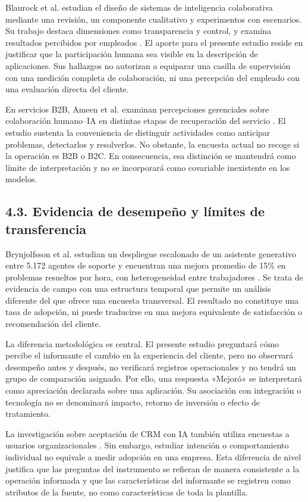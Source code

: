 \documentclass[12pt,letterpaper]{article}
\begin{document}
Blaurock et al. estudian el diseño de sistemas de inteligencia colaborativa mediante una revisión, un componente cualitativo y experimentos con escenarios. Su trabajo destaca dimensiones como transparencia y control, y examina resultados percibidos por empleados \citep{blaurock}. El aporte para el presente estudio reside en justificar que la participación humana sea visible en la descripción de aplicaciones. Sus hallazgos no autorizan a equiparar una casilla de supervisión con una medición completa de colaboración, ni una percepción del empleado con una evaluación directa del cliente.

En servicios B2B, Ameen et al. examinan percepciones gerenciales sobre colaboración humano--IA en distintas etapas de recuperación del servicio \citep{ameen}. El estudio sustenta la conveniencia de distinguir actividades como anticipar problemas, detectarlos y resolverlos. No obstante, la encuesta actual no recoge si la operación es B2B o B2C. En consecuencia, esa distinción se mantendrá como límite de interpretación y no se incorporará como covariable inexistente en los modelos.

\subsection*{4.3. Evidencia de desempeño y límites de transferencia}
Brynjolfsson et al. estudian un despliegue escalonado de un asistente generativo entre 5.172 agentes de soporte y encuentran una mejora promedio de 15\% en problemas resueltos por hora, con heterogeneidad entre trabajadores \citep{bryn}. Se trata de evidencia de campo con una estructura temporal que permite un análisis diferente del que ofrece una encuesta transversal. El resultado no constituye una tasa de adopción, ni puede traducirse en una mejora equivalente de satisfacción o recomendación del cliente.

La diferencia metodológica es central. El presente estudio preguntará cómo percibe el informante el cambio en la experiencia del cliente, pero no observará desempeño antes y después, no verificará registros operacionales y no tendrá un grupo de comparación asignado. Por ello, una respuesta «Mejoró» se interpretará como apreciación declarada sobre una aplicación. Su asociación con integración o tecnología no se denominará impacto, retorno de inversión o efecto de tratamiento.

La investigación sobre aceptación de CRM con IA también utiliza encuestas a usuarios organizacionales \citep{chatterjee}. Sin embargo, estudiar intención o comportamiento individual no equivale a medir adopción en una empresa. Esta diferencia de nivel justifica que las preguntas del instrumento se refieran de manera consistente a la operación informada y que las características del informante se registren como atributos de la fuente, no como características de toda la plantilla.
\end{document}
